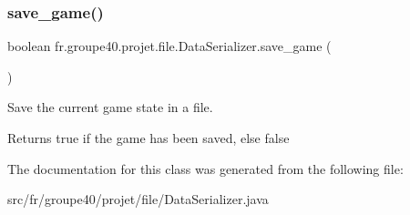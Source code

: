 \subsubsection{\texorpdfstring{save\+\_\+game()}{save\_game()}}
{\footnotesize\ttfamily boolean fr.\+groupe40.\+projet.\+file.\+Data\+Serializer.\+save\+\_\+game (\begin{DoxyParamCaption}{ }\end{DoxyParamCaption})}



Save the current game state in a file. 

\begin{DoxyReturn}{Returns}
true if the game has been saved, else false 
\end{DoxyReturn}


The documentation for this class was generated from the following file\+:\begin{DoxyCompactItemize}
\item 
src/fr/groupe40/projet/file/Data\+Serializer.\+java\end{DoxyCompactItemize}
